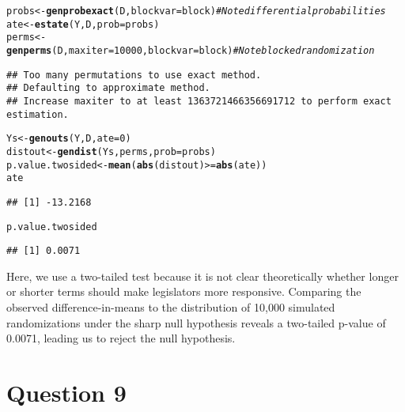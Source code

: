 \documentclass[11pt,notitlepage]{article}\usepackage[]{graphicx}\usepackage[]{color}
\makeatletter
\newcommand{\hlnum}[1]{\textcolor[rgb]{0.686,0.059,0.569}{#1}}%
\newcommand{\hlcom}[1]{\textcolor[rgb]{0.678,0.584,0.686}{\textit{#1}}}%
\newcommand{\hlopt}[1]{\textcolor[rgb]{0,0,0}{#1}}%
\newcommand{\hlstd}[1]{\textcolor[rgb]{0.345,0.345,0.345}{#1}}%
\newcommand{\hlkwb}[1]{\textcolor[rgb]{0.69,0.353,0.396}{#1}}%
\newcommand{\hlkwc}[1]{\textcolor[rgb]{0.333,0.667,0.333}{#1}}%
\newcommand{\hlkwd}[1]{\textcolor[rgb]{0.737,0.353,0.396}{\textbf{#1}}}%
\newenvironment{kframe}{%
 \def\at@end@of@kframe{}%
 \ifinner\ifhmode%
  \def\at@end@of@kframe{\end{minipage}}%
  \begin{minipage}{\columnwidth}%
 \fi\fi%
 \def\FrameCommand##1{\hskip\@totalleftmargin \hskip-\fboxsep
 \colorbox{shadecolor}{##1}\hskip-\fboxsep
     \hskip-\linewidth \hskip-\@totalleftmargin \hskip\columnwidth}%
 \MakeFramed {\advance\hsize-\width
   \@totalleftmargin\z@ \linewidth\hsize
   \@setminipage}}%
 {\par\unskip\endMakeFramed%
 \at@end@of@kframe}
\newenvironment{knitrout}{}{} %
\makeatother
\begin{document}
\begin{enumerate}[a)]
\begin{knitrout}
\color{fgcolor}\begin{kframe}
\begin{alltt}
\hlstd{probs} \hlkwb{<-} \hlkwd{genprobexact}\hlstd{(D,}\hlkwc{blockvar}\hlstd{=block)} \hlcom{# Note differential probabilities}
\hlstd{ate} \hlkwb{<-} \hlkwd{estate}\hlstd{(Y,D,}\hlkwc{prob}\hlstd{=probs)}
\hlstd{perms} \hlkwb{<-} \hlkwd{genperms}\hlstd{(D,}\hlkwc{maxiter}\hlstd{=}\hlnum{10000}\hlstd{,}\hlkwc{blockvar}\hlstd{=block)} \hlcom{# Note blocked randomization}
\end{alltt}
\begin{verbatim}
## Too many permutations to use exact method.
## Defaulting to approximate method.
## Increase maxiter to at least 1363721466356691712 to perform exact estimation.
\end{verbatim}
\begin{alltt}
\hlstd{Ys} \hlkwb{<-} \hlkwd{genouts}\hlstd{(Y,D,}\hlkwc{ate}\hlstd{=}\hlnum{0}\hlstd{)}
\hlstd{distout} \hlkwb{<-} \hlkwd{gendist}\hlstd{(Ys,perms,}\hlkwc{prob}\hlstd{=probs)}
\hlstd{p.value.twosided} \hlkwb{<-} \hlkwd{mean}\hlstd{(}\hlkwd{abs}\hlstd{(distout)} \hlopt{>=} \hlkwd{abs}\hlstd{(ate))}
\hlstd{ate}
\end{alltt}
\begin{verbatim}
## [1] -13.2168
\end{verbatim}
\begin{alltt}
\hlstd{p.value.twosided}
\end{alltt}
\begin{verbatim}
## [1] 0.0071
\end{verbatim}
\end{kframe}
\end{knitrout}

Here, we use a two-tailed test because it is not clear theoretically whether longer or shorter terms should make legislators more responsive. Comparing the observed difference-in-means to the distribution of 10,000 simulated randomizations under the sharp null hypothesis reveals a two-tailed p-value of 0.0071, leading us to reject the null hypothesis. 
\end{enumerate}

\section*{Question 9}
\end{document}
